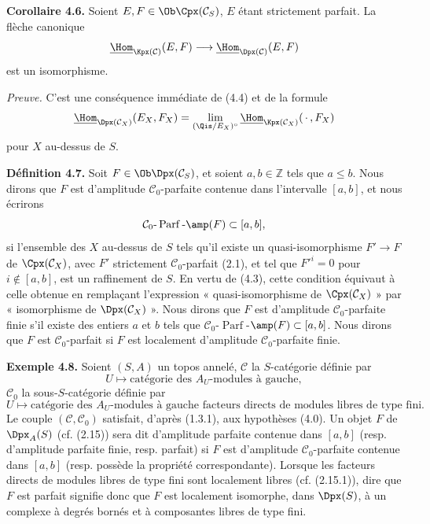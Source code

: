 \documentclass[11pt]{article}
\newcommand{\Parf}{\operatorname{Parf}}
\begin{document}
\textbf{Corollaire 4.6.} Soient \(E,F\in\Ob\Cpx(\mathcal C_S)\), \(E\) étant strictement parfait. La flèche canonique
\[
  \underline{\Hom}_{\Kpx(\mathcal C)}(E,F)
  \longrightarrow
  \underline{\Hom}_{\Dpx(\mathcal C)}(E,F)
\]
est un isomorphisme.

\emph{Preuve.} C'est une conséquence immédiate de (4.4) et de la formule
\[
  \underline{\Hom}_{\Dpx(\mathcal C_X)}(E_X,F_X)
  = \lim_{(\Qis/E_X)^\circ}\underline{\Hom}_{\Kpx(\mathcal C_X)}(\,\cdot\,,F_X)
\]
pour \(X\) au-dessus de \(S\).

\textbf{Définition 4.7.} Soit \(F\in\Ob\Dpx(\mathcal C_S)\), et soient \(a,b\in\mathbb Z\) tels que \(a\leq b\). Nous dirons que \(F\) est d'amplitude \(\mathcal C_0\)-parfaite contenue dans l'intervalle \([a,b]\), et nous écrirons
\[
  \mathcal C_0\text{-}\Parf\text{-}\amp(F)\subset[a,b],
\]
si l'ensemble des \(X\) au-dessus de \(S\) tels qu'il existe un quasi-isomorphisme \(F'\to F\) de \(\Cpx(\mathcal C_X)\), avec \(F'\) strictement \(\mathcal C_0\)-parfait (2.1), et tel que \(F'^i=0\) pour \(i\notin[a,b]\), est un raffinement de \(S\). En vertu de (4.3), cette condition équivaut à celle obtenue en remplaçant l'expression « quasi-isomorphisme de \(\Cpx(\mathcal C_X)\) » par « isomorphisme de \(\Dpx(\mathcal C_X)\) ». Nous dirons que \(F\) est d'amplitude \(\mathcal C_0\)-parfaite finie s'il existe des entiers \(a\) et \(b\) tels que \(\mathcal C_0\)-\(\Parf\)-\(\amp(F)\subset[a,b]\). Nous dirons que \(F\) est \(\mathcal C_0\)-parfait si \(F\) est localement d'amplitude \(\mathcal C_0\)-parfaite finie.

\textbf{Exemple 4.8.} Soient \((S,A)\) un topos annelé, \(\mathcal C\) la \(S\)-catégorie définie par
\[
  U\longmapsto \text{catégorie des }A_U\text{-modules à gauche},
\]
\(\mathcal C_0\) la sous-\(S\)-catégorie définie par
\[
  U\longmapsto \text{catégorie des }A_U\text{-modules à gauche facteurs directs de modules libres de type fini}.
\]
Le couple \((\mathcal C,\mathcal C_0)\) satisfait, d'après (1.3.1), aux hypothèses (4.0). Un objet \(F\) de \(\Dpx_A(S)\) (cf. (2.15)) sera dit d'amplitude parfaite contenue dans \([a,b]\) (resp. d'amplitude parfaite finie, resp. parfait) si \(F\) est d'amplitude \(\mathcal C_0\)-parfaite contenue dans \([a,b]\) (resp. possède la propriété correspondante). Lorsque les facteurs directs de modules libres de type fini sont localement libres (cf. (2.15.1)), dire que \(F\) est parfait signifie donc que \(F\) est localement isomorphe, dans \(\Dpx(S)\), à un complexe à degrés bornés et à composantes libres de type fini.
\end{document}

